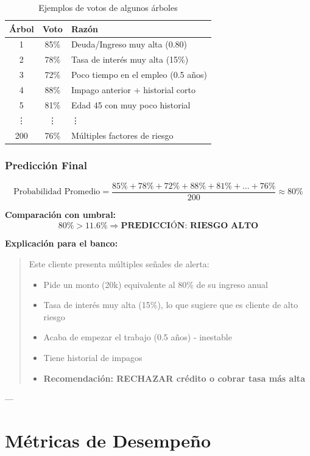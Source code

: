 \documentclass[11pt,a4paper,spanish]{article}
\begin{document}
\begin{table}[H]
\centering
\begin{tabular}{|c|c|l|}
\hline
\textbf{Árbol} & \textbf{Voto} & \textbf{Razón} \\
\hline
1 & 85\% & Deuda/Ingreso muy alta (0.80) \\
2 & 78\% & Tasa de interés muy alta (15\%) \\
3 & 72\% & Poco tiempo en el empleo (0.5 años) \\
4 & 88\% & Impago anterior + historial corto \\
5 & 81\% & Edad 45 con muy poco historial \\
\vdots & \vdots & \vdots \\
200 & 76\% & Múltiples factores de riesgo \\
\hline
\end{tabular}
\caption{Ejemplos de votos de algunos árboles}
\end{table}

\subsubsection{Predicción Final}

\[
\text{Probabilidad Promedio} = \frac{85\% + 78\% + 72\% + 88\% + 81\% + \ldots + 76\%}{200} \approx 80\%
\]

\textbf{Comparación con umbral:}
\[
80\% > 11.6\% \Rightarrow \textbf{PREDICCIÓN: RIESGO ALTO}
\]

\textbf{Explicación para el banco:}
\begin{quote}
Este cliente presenta múltiples señales de alerta:
\begin{itemize}
    \item Pide un monto (20k) equivalente al 80\% de su ingreso anual
    \item Tasa de interés muy alta (15\%), lo que sugiere que es cliente de alto riesgo
    \item Acaba de empezar el trabajo (0.5 años) - inestable
    \item Tiene historial de impagos
    \item \textbf{Recomendación: RECHAZAR crédito o cobrar tasa más alta}
\end{itemize}
\end{quote}

---

\section{Métricas de Desempeño}
\end{document}
